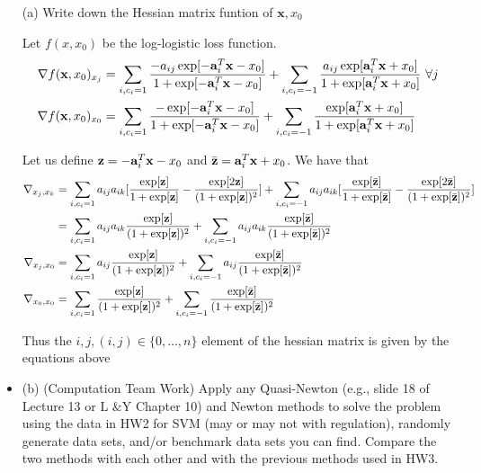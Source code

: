 \documentclass[answers]{exam} %
\newcommand{\B}[1]{\mathbf{#1}}
\renewcommand\a{{\bf a}}
\newcommand\z{{\bf z}}
\newcommand\x{{\bf x}}
\renewcommand\a{{\bf a}}
\begin{document}
\begin{itemize}

\item[(a)]
Write down the Hessian matrix funtion of $\B{x}, x_0$


\begin{framed}

Let $f(x,x_0)$ be the log-logistic loss function. 
\begin{equation*}
\begin{aligned}
\nabla f(\x,x_0)_{x_j} &= \sum_{i,c_i = 1} \frac{-a_{ij} \exp[ -\a_i^T \x - x_0 ]}{ 1 + \exp[ -\a_i^T \x - x_0 ]} + \sum_{i, c_i = -1} \frac{a_{ij} \exp[ \a_i^T \x + x_0 ]}{ 1 + \exp[ \a_i^T \x + x_0 ]}  \mbox{  } \forall j \\
\nabla f(\x,x_0)_{x_0} &= \sum_{i,c_i = 1} \frac{- \exp[ -\a_i^T \x - x_0 ]}{ 1 + \exp[ -\a_i^T \x - x_0 ]} + \sum_{i, c_i = -1} \frac{ \exp[ \a_i^T \x + x_0 ]}{ 1 + \exp[ \a_i^T \x + x_0 ]} \\  
\end{aligned}
\end{equation*}


Let us define $\z = -\a_i^T \x - x_0 $ and $\bar{\z} =  \a_i^T \x + x_0$. We have that 
\begin{equation*}
\begin{aligned}
\nabla_{x_j, x_k} &= \sum_{i, c_i=1} a_{ij} a_{ik} [\frac{\exp[\z]}{ 1+ \exp[\z]}  - \frac{ \exp[2 \z]}{(1 + \exp[\z])^2}] + \sum_{i, c_i = -1} a_{ij} a_{ik} [\frac{\exp[\bar{\z}]}{ 1+ \exp[\bar{\z}]} - \frac{ \exp[ 2 \bar{\z}] }{(1 + \exp[\bar{\z}])^2}] \\ 
&= \sum_{i, c_i=1} a_{ij} a_{ik} \frac{\exp[\z]}{(1 + \exp[\z])^2} +  \sum_{i, c_i=-1} a_{ij} a_{ik} \frac{\exp[\bar{\z}]}{(1 + \exp[\bar{\z}])^2}\\ 
\nabla_{x_j, x_0} &= \sum_{i, c_i=1} a_{ij}  \frac{\exp[\z]}{(1 + \exp[\z])^2} +  \sum_{i, c_i=-1} a_{ij} \frac{\exp[\bar{\z}]}{(1 + \exp[\bar{\z}])^2} \\ 
\nabla_{x_0, x_0} &= \sum_{i, c_i=1} \frac{\exp[\z]}{(1 + \exp[\z])^2} +  \sum_{i, c_i=-1}  \frac{\exp[\bar{\z}]}{(1 + \exp[\bar{\z}])^2}
\end{aligned}
\end{equation*}

Thus the $i, j, (i,j) \in \{ 0, \hdots, n \}$ element of the hessian matrix is given by the equations above 
\\
\end{framed}

\item (b) (Computation Team Work) Apply any Quasi-Newton (e.g., slide 18 of Lecture
13 or L $\&$Y Chapter 10) and Newton methods to solve the problem using the
data in HW2 for SVM (may or may not with regulation), randomly generate data
sets, and/or benchmark data sets you can find. Compare the two methods with
each other and with the previous methods used in HW3.
\end{itemize}
\end{document}
